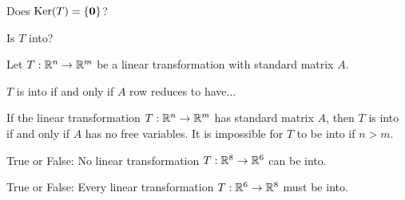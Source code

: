 Does $\mathrm{Ker}(T) = \{\mathbf{0}\}$?  



Is $T$ into?  




\edXsolution{ 

}
\endedxproblem





Let $T: \mathbb R^n \rightarrow \mathbb R^m$ be a linear transformation with standard matrix $A$.

$T$ is into if and only if $A$ row reduces to have...


\edXsolution{ 

}
\endedxproblem


\endedxvertical











{}  
If the linear transformation $T: \mathbb R^n \rightarrow \mathbb R^m$ has standard matrix $A$, then $T$ is into if and only if $A$ has no free variables.  It is impossible for $T$ to be into if $n>m$.   

\endedxtext


True or False: No linear transformation $T: \mathbb R^8 \rightarrow \mathbb R^6$ can be into.  


True or False: Every linear transformation $T: \mathbb R^6 \rightarrow \mathbb R^8$ must be into.  


\edXsolution{ 

}
\endedxproblem

\endedxvertical